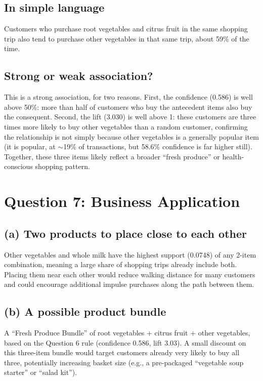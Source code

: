 \documentclass[11pt]{article}
\begin{document}
\subsection*{In simple language}
Customers who purchase root vegetables and citrus fruit in the same shopping trip also tend to purchase other vegetables in that same trip, about 59\% of the time.

\subsection*{Strong or weak association?}
This is a strong association, for two reasons. First, the confidence (0.586) is well above 50\%: more than half of customers who buy the antecedent items also buy the consequent. Second, the lift (3.030) is well above 1: these customers are three times more likely to buy other vegetables than a random customer, confirming the relationship is not simply because other vegetables is a generally popular item (it is popular, at $\sim$19\% of transactions, but 58.6\% confidence is far higher still). Together, these three items likely reflect a broader ``fresh produce'' or health-conscious shopping pattern.

\section*{Question 7: Business Application}

\subsection*{(a) Two products to place close to each other}
Other vegetables and whole milk have the highest support (0.0748) of any 2-item combination, meaning a large share of shopping trips already include both. Placing them near each other would reduce walking distance for many customers and could encourage additional impulse purchases along the path between them.

\subsection*{(b) A possible product bundle}
A ``Fresh Produce Bundle'' of root vegetables + citrus fruit + other vegetables, based on the Question 6 rule (confidence 0.586, lift 3.03). A small discount on this three-item bundle would target customers already very likely to buy all three, potentially increasing basket size (e.g., a pre-packaged ``vegetable soup starter'' or ``salad kit'').
\end{document}
